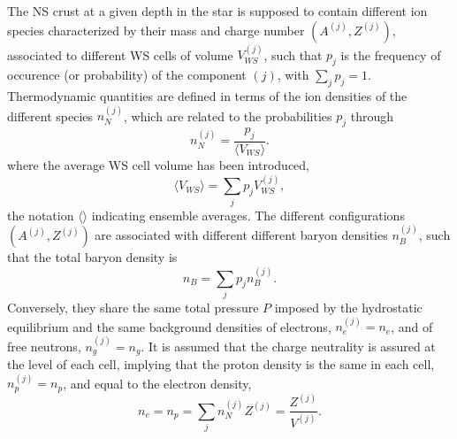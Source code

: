 The NS crust at a given depth in the star is supposed to contain different ion
species characterized by their mass and charge number $(A^{(j)},Z^{(j)})$, 
associated to different WS cells of volume $V_{WS}^{(j)}$, such that $p_j$ is 
the frequency of occurence (or probability) of the component $(j)$, with 
$\sum_j p_j = 1$.
Thermodynamic quantities are defined in terms of the ion densities of the 
different species $n_N^{(j)}$, which are related to the probabilities $p_j$ 
through 
%
\begin{equation}
  n_N^{(j)}=\frac{p_j}{\langle V_{WS}\rangle}.\label{eq:nnj}
\end{equation}
%
where the average WS cell volume has been introduced,
%
\begin{equation}
  \langle V_{WS} \rangle = \sum_j p_j V_{WS}^{(j)},
\end{equation}
%
the notation $\langle\rangle$ indicating ensemble averages.
The different configurations $(A^{(j)},Z^{(j)})$ are associated with different
different baryon densities $n_B^{(j)}$, such that the total baryon density is
%
\begin{equation}
  n_B = \sum_j p_j n_B^{(j)}.
\end{equation}
%
Conversely, they share the same total pressure $P$ imposed by the hydrostatic 
equilibrium and the same background densities of electrons, $n_e^{(j)}=n_e$, 
and of free neutrons, $n_g^{(j)}=n_g$.
It is assumed that the charge neutrality is assured at the level of each cell,
implying that the proton density is the same in each cell, $n_p^{(j)}=n_p$, and
equal to the electron density, 
%
\begin{equation}
  n_e = n_p = \sum_j n_N^{(j)} Z^{(j)} = \frac{Z^{(j)}}{V^{(j)}}.
\end{equation}

